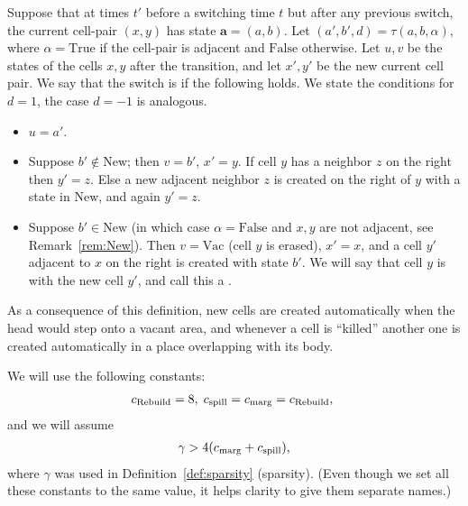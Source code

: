 \documentclass[11pt]{memoir}
\theoremstyle{definition} %
\renewcommand{\ge}{\geq}
\renewcommand{\vek}[1]{\mathbf{#1}}
\newcommand{\va}{\vek{a}} %
\newcommand{\Vacant}{\mathrm{Vac}}
\newcommand{\New}{\mathrm{New}}
\newcommand{\True}{\mathrm{True}}
\newcommand{\False}{\mathrm{False}}
\newcommand{\cns}[1]{c_{\textrm{\upshape #1}}}
\newcommand{\CMarg}{\cns{marg}}
\newcommand{\CPass}{\cns{pass}}
\newcommand{\CRebuild}{\cns{Rebuild}}
\newcommand{\CSpill}{\cns{spill}}
\begin{document}
\begin{definition}[Transition]\label{def:dictated}
Suppose that at times \( t' \) before a switching time \( t \) but after 
any previous switch, the current cell-pair \( (x,y) \) has state \( \va = (a,b)\).
Let \( (a',b',d) =\tau(a,b,\alpha) \), where \( \alpha=\True \) if the cell-pair is adjacent and \( \False \)
otherwise.
Let \( u,v \) be the states of the cells \( x,y \) after the transition, and
let \( x',y' \) be the new current cell pair.
We say that the switch is  if the following holds.
We state the conditions for \( d=1 \), the case \( d=-1 \) is analogous.
\begin{itemize}
\item \( u=a' \).
  
  \item Suppose \( b'\not\in\New \); then \( v=b' \), \( x'=y \).
    If cell \( y \) has a neighbor \( z \) on the right then \( y'=z \).
    Else a new adjacent neighbor \( z \) is created on the right of \( y \)
    with a state in \( \New \), and again \( y'=z \).

  \item Suppose \( b'\in\New \) (in which case \( \alpha=\False \) and \( x,y \) are not adjacent,
    see Remark~\ref{rem:New}).
    Then \( v=\Vacant \) (cell \( y \) is erased), \( x'=x \), and a cell \( y' \) adjacent to \( x \) on the right
    is created with state \( b' \).
    We will say that cell \( y \) is  with the new cell \( y' \), and call this a .
\end{itemize}
\end{definition}

As a consequence of this definition, new cells are created
automatically when the head would step onto a vacant area,
and whenever a cell is ``killed'' another one is created automatically in a place overlapping with its body.

We will use the following constants:  %
\begin{align}\label{eq:cns.traj}
  \CRebuild = 8,\;
  \CSpill = \CMarg = \CRebuild,\;
\end{align}
and we will assume
\begin{align}\label{eq:beta-lb}
  \gamma> 4(\CMarg + \CSpill),  %
\end{align}
where \( \gamma \) was used in Definition~\ref{def:sparsity} (sparsity).
(Even though we set all these constants to the same value, it helps clarity 
to give them separate names.)
\end{document}
